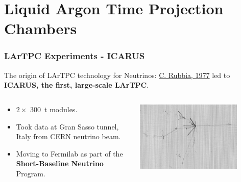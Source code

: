 \section {Liquid Argon Time Projection Chambers}


\begin{frame}
  \frametitle{LArTPC Experiments - ICARUS}

  The origin of LArTPC technology for Neutrinos: \href{http://cds.cern.ch/record/117852/files/CERN-EP-INT-77-8.pdf}{C. Rubbia, 1977} led to \textbf{ICARUS, the first, large-scale LArTPC}.

  \begin{columns}
    \begin{column}{0.5\textwidth}
      \begin{itemize}
      \item $2\times$ \SI{300}{\tonne} modules.
      \item Took data at Gran Sasso tunnel, Italy from CERN neutrino beam.
      \item Moving to Fermilab as part of the \textbf{Short-Baseline
        Neutrino} Program.
      \end{itemize}
    \end{column}
    \begin{column}{0.5\textwidth}
      \includegraphics[width=0.8\textwidth]{icarus.png}
    \end{column}
  \end{columns}
\end{frame}

